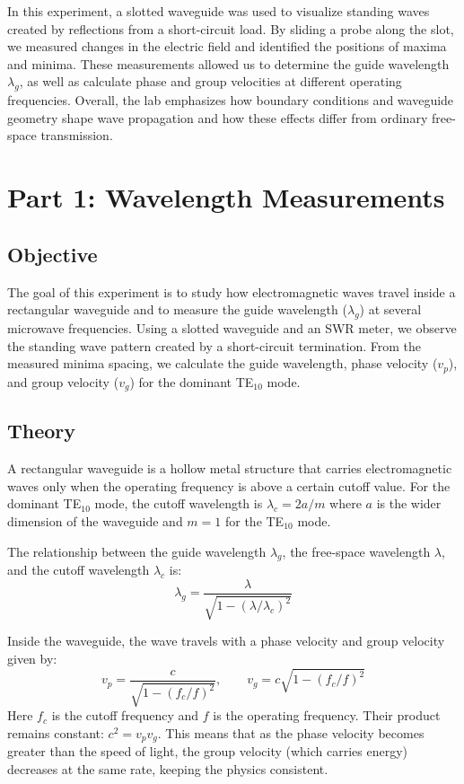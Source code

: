 \documentclass[11pt,letterpaper]{article}
\begin{document}
In this experiment, a slotted waveguide was used to visualize standing waves created by reflections from a short-circuit load. By sliding a probe along the slot, we measured changes in the electric field and identified the positions of maxima and minima. These measurements allowed us to determine the guide wavelength $\lambda_g$, as well as calculate phase and group velocities at different operating frequencies. Overall, the lab emphasizes how boundary conditions and waveguide geometry shape wave propagation and how these effects differ from ordinary free-space transmission.

\section{Part 1: Wavelength Measurements}

\subsection*{Objective}

The goal of this experiment is to study how electromagnetic waves travel inside a rectangular waveguide and to measure the guide wavelength ($\lambda_g$) at several microwave frequencies. Using a slotted waveguide and an SWR meter, we observe the standing wave pattern created by a short-circuit termination. From the measured minima spacing, we calculate the guide wavelength, phase velocity ($v_p$), and group velocity ($v_g$) for the dominant TE$_{10}$ mode.

\subsection*{Theory}

A rectangular waveguide is a hollow metal structure that carries electromagnetic waves only when the operating frequency is above a certain cutoff value. For the dominant TE$_{10}$ mode, the cutoff wavelength is $\lambda_c = 2a/m$ where $a$ is the wider dimension of the waveguide and $m=1$ for the TE$_{10}$ mode.

The relationship between the guide wavelength $\lambda_g$, the free-space wavelength $\lambda$, and the cutoff wavelength $\lambda_c$ is:
\[
\lambda_g = \frac{\lambda}{\sqrt{1 - (\lambda/\lambda_c)^2}}
\]

Inside the waveguide, the wave travels with a phase velocity and group velocity given by:
\[
v_p = \frac{c}{\sqrt{1 - (f_c/f)^2}}, \qquad v_g = c\sqrt{1 - (f_c/f)^2}
\]
Here $f_c$ is the cutoff frequency and $f$ is the operating frequency. Their product remains constant: $c^2 = v_p v_g$. This means that as the phase velocity becomes greater than the speed of light, the group velocity (which carries energy) decreases at the same rate, keeping the physics consistent.
\end{document}
